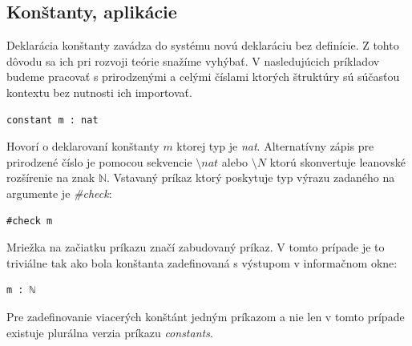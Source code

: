 \documentclass[a4paper,10pt,oneside]{report}%
\begin{document}
\subsection{Konštanty, aplikácie}
    Deklarácia konštanty zavádza do systému novú deklaráciu bez definície.
    Z tohto dôvodu sa ich pri rozvoji teórie snažíme vyhýbať.
    V nasledujúcich príkladov budeme pracovať s prirodzenými a celými číslami
ktorých štruktúry sú súčasťou kontextu bez nutnosti ich importovať.
\begin{lstlisting}
constant m : nat
\end{lstlisting}
    Hovorí o deklarovaní konštanty $m$ ktorej typ je \emph{nat}.
    Alternatívny zápis pre prirodzené číslo je pomocou sekvencie $\texttt{\textbackslash}nat$
alebo $\texttt{\textbackslash}N$ ktorú skonvertuje leanovské rozšírenie na znak $\mathbb{N}$.
    Vstavaný príkaz ktorý poskytuje typ výrazu zadaného na argumente je \emph{\#check}:
\begin{lstlisting}
#check m
\end{lstlisting}
    Mriežka na začiatku príkazu značí zabudovaný príkaz.
    V tomto prípade je to triviálne tak ako bola konštanta zadefinovaná s výstupom
v informačnom okne:
\begin{lstlisting}
m : ℕ
\end{lstlisting}
    Pre zadefinovanie viacerých konštánt jedným príkazom a nie len v tomto prípade
existuje plurálna verzia príkazu \emph{constants}.
\end{document}
